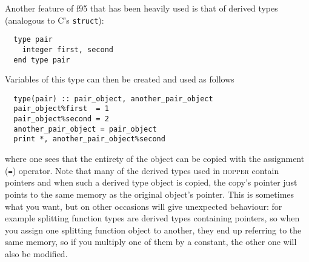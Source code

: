 \documentclass[12pt]{article}
\newcommand{\hopper}{\textsc{hopper}\xspace}
\begin{document}
Another feature of f95 that has been heavily used is that of derived
types (analogous to C's \texttt{struct}):
\begin{verbatim}
  type pair
    integer first, second
  end type pair 
\end{verbatim}
Variables of this type can then be created and used as follows
\begin{verbatim}
  type(pair) :: pair_object, another_pair_object
  pair_object%first  = 1
  pair_object%second = 2
  another_pair_object = pair_object
  print *, another_pair_object%second
\end{verbatim}
where one sees that the entirety of the object can be copied with the
assignment (\texttt{=}) operator. Note that many of the derived types
used in \hopper contain pointers and when such a derived type object
is copied, the copy's pointer just points to the same memory as the
original object's pointer. This is sometimes what you want, but on
other occasions will give unexpected behaviour: for example splitting
function types are derived types containing pointers, so when you
assign one splitting function object to another, they end up referring
to the same memory, so if you multiply one of them by a constant, the
other one will also be modified.
\end{document}
